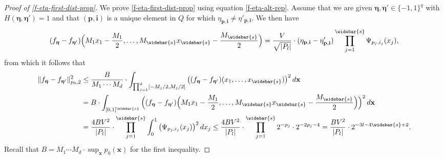 \documentclass[10pt]{article}
\newcommand{\xbf}{{\mathbf{x}}}
\newcommand{\pbf}{{\mathbf{p}}}
\newcommand{\ibf}{{\mathbf{i}}}
\newcommand{\etabf}{{\boldsymbol{\eta}}}
\begin{document}
\begin{proof}[Proof of \eqref{f-eta-first-dist-prop}]
We prove \eqref{f-eta-first-dist-prop} using equation 
\eqref{f-eta-alt-rep}. Assume that we are given 
$\etabf, \etabf' \in \{-1, 1\}^q$ with $H(\etabf, \etabf') = 1$ and 
that $(\pbf, \ibf)$ is a unique element in $Q$ for which 
$\eta_{\pbf, \ibf} \neq \eta'_{\pbf, \ibf}$. 
We then have
\begin{equation*}
    (f_{\etabf} - f_{\etabf'})\Big(M_1 x_1 - \frac{M_1}{2}, \dots, 
    M_{\widebar{s}} x_{\widebar{s}} - \frac{M_{\widebar{s}}}{2}\Big) 
    = \frac{V}{\sqrt{|P_l|}} \cdot
    (\eta_{\pbf, \ibf} - \eta'_{\pbf, \ibf}) 
    \prod_{j=1}^{\widebar{s}} \Psi_{p_j, i_j} (x_j), 
\end{equation*}
from which it follows that 
\begin{equation*}
\begin{aligned}
    \| f_{\etabf} - f_{\etabf'}\|_{p_0, 2}^2 
    &\le \frac{B}{M_1 \cdots M_d} 
    \cdot \int_{\prod_{j = 1}^{d} [-M_j/2, M_j/2]} 
    \big((f_{\etabf} - f_{\etabf'})(x_1, \dots, x_{\widebar{s}})\big)^2 
    \, d\xbf \\
    &= B \cdot \int_{[0, 1]^{\widebar{s}}} 
    \Big((f_{\etabf} - f_{\etabf'})\Big(M_1 x_1 - \frac{M_1}{2}, \dots, 
    M_{\widebar{s}} x_{\widebar{s}} 
    - \frac{M_{\widebar{s}}}{2}\Big)\Big)^2 \, d\xbf \\
    &= \frac{4BV^2}{|P_l|} \cdot \prod_{j = 1}^{\widebar{s}} 
    \int_{0}^{1} \big( \Psi_{p_j, i_j} (x_j) \big)^2 \, dx_j 
    \le \frac{4 BV^2}{|P_l|} \cdot 
    \prod_{j = 1}^{\widebar{s}} 2^{-p_j} \cdot 2^{-2p_j - 4}
    = \frac{BV^2}{|P_l|} \cdot 2^{-3l - 4\widebar{s} + 2}. 
\end{aligned}
\end{equation*}
Recall that $B = M_1 \cdots M_d \cdot \sup_{\xbf} p_0(\xbf)$ 
for the first inequality.
\end{proof}
\end{document}
